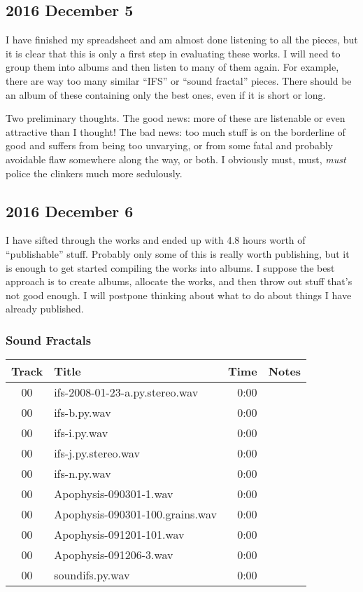 \documentclass[english,11pt,letterpaper,onecolumn]{scrartcl}
\begin{document}
\subsection*{2016 December 5}

I have finished my spreadsheet and am almost done listening to all the pieces, but it is clear that this is only a first step in evaluating these works. I will need to group them into albums and then listen to many of them again. For example, there are way too many similar ``IFS'' or ``sound fractal'' pieces. There should be an album of these containing only the best ones, even if it is short or long.

Two preliminary thoughts. The good news: more of these are listenable or even attractive than I thought! The bad news: too much stuff is on the borderline of good and suffers from being too unvarying, or from some fatal and probably avoidable flaw somewhere along the way, or both. I obviously must, must, \emph{must} police the clinkers much more sedulously.

\subsection*{2016 December 6}

I have sifted through the works and ended up with 4.8 hours worth of ``publishable'' stuff. Probably only some of this is really worth publishing, but it is enough to get started compiling the works into albums. I suppose the best approach is to create albums, allocate the works, and then throw out stuff that's not good enough. I will postpone thinking about what to do about things I have already published.

\subsubsection*{Sound Fractals}

\begin{tabular}{|c|l|r|l|}
	\hline 
	Track & Title & Time & Notes \\ 
	\hline 
	00 & ifs-2008-01-23-a.py.stereo.wav & 0:00 & \\
	00 & ifs-b.py.wav & 0:00 & \\
	00 & ifs-i.py.wav & 0:00 & \\
	00 & ifs-j.py.stereo.wav & 0:00 & \\
	00 & ifs-n.py.wav & 0:00 & \\
	00 & Apophysis-090301-1.wav & 0:00 & \\
	00 & Apophysis-090301-100.grains.wav & 0:00 & \\
	00 & Apophysis-091201-101.wav & 0:00 & \\
	00 & Apophysis-091206-3.wav & 0:00 & \\
	00 & soundifs.py.wav & 0:00 & \\
	\hline 
\end{tabular} 
\end{document}
